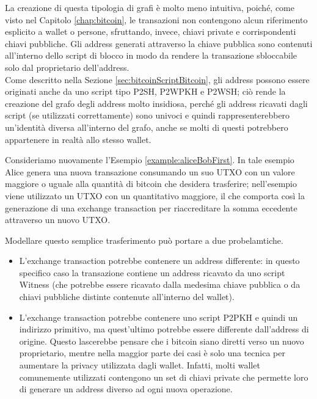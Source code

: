 La creazione di questa tipologia di grafi è molto meno intuitiva, poiché, come visto nel Capitolo \ref{chap:bitcoin}, le transazioni non contengono alcun riferimento esplicito a wallet o persone, sfruttando, invece, chiavi private e corrispondenti chiavi pubbliche. Gli address generati attraverso la chiave pubblica sono contenuti all’interno dello script di blocco in modo da rendere la transazione sbloccabile solo dal proprietario dell’address. \\
Come descritto nella Sezione \ref{sec:bitcoinScriptBitcoin}, gli address possono essere originati anche da uno script tipo P2SH, P2WPKH e P2WSH; ciò rende la creazione del grafo degli address molto insidiosa, perché gli address ricavati dagli script (se utilizzati correttamente) sono univoci e quindi rappresenterebbero un’identità diversa all’interno del grafo, anche se molti di questi potrebbero appartenere in realtà allo stesso wallet.

\begin{example}
Consideriamo nuovamente l’Esempio \ref{example:aliceBobFirst}. In tale esempio  Alice genera una nuova transazione consumando un suo UTXO con un valore maggiore o uguale alla quantità  di bitcoin che desidera trasferire; nell'esempio viene utilizzato un UTXO con un quantitativo maggiore, il che comporta così la generazione di una exchange transaction per riaccreditare la somma eccedente attraverso un nuovo UTXO.

Modellare questo semplice trasferimento può portare a due probelamtiche.

\begin{itemize}
  \item L’exchange transaction potrebbe contenere un address differente: in questo specifico caso la transazione contiene un address ricavato da uno script Witness (che potrebbe essere ricavato dalla medesima chiave pubblica o da chiavi pubbliche distinte contenute all’interno del wallet).

  \item L'exchange transaction potrebbe contenere uno script P2PKH e quindi un indirizzo primitivo, ma quest’ultimo potrebbe essere differente dall’address di origine. Questo lascerebbe pensare che i bitcoin  siano diretti verso un nuovo proprietario, mentre nella maggior parte dei casi è solo una tecnica per aumentare la privacy utilizzata dagli wallet.
Infatti, molti  wallet comunemente utilizzati contengono un set di chiavi private che permette loro di generare un address diverso ad ogni nuova operazione.
\end{itemize}

\end{example}

